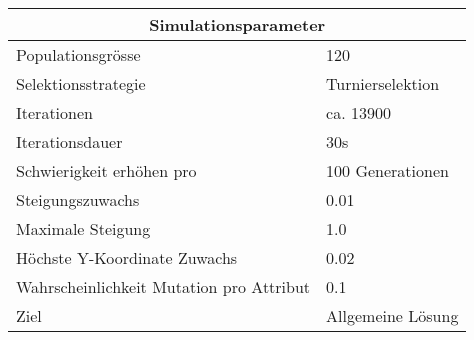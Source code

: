 
\begin{tabular}{ | l | l | }

  \hline
  \multicolumn{2}{|c|}{Simulationsparameter} \\
  \hline
  Populationsgrösse & 120 \\ \hline
  Selektionsstrategie & Turnierselektion \\ \hline
  Iterationen & ca. 13900 \\ \hline
  Iterationsdauer & 30s \\ \hline
  Schwierigkeit erhöhen pro & 100 Generationen \\ \hline
  Steigungszuwachs & 0.01 \\ \hline
  Maximale Steigung & 1.0 \\ \hline
  Höchste Y-Koordinate Zuwachs  & 0.02 \\ \hline
  Wahrscheinlichkeit Mutation pro Attribut & 0.1 \\ \hline
  Ziel & Allgemeine Lösung \\ \hline
  
\end{tabular}
